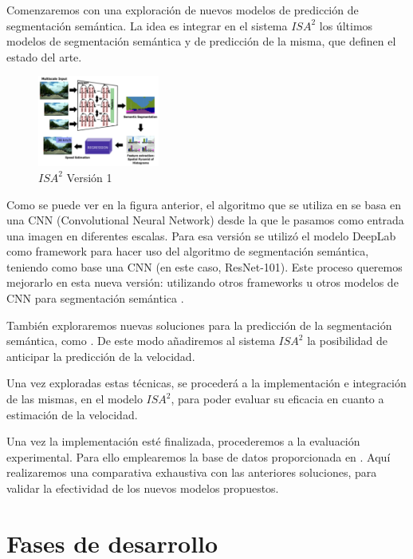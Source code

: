 \documentclass[12pt,oneside,a4paper]{article}
\begin{document}
Comenzaremos con una exploración de nuevos modelos de predicción de segmentación semántica. La idea es integrar en el sistema $ISA^2$ los últimos modelos de segmentación semántica y de predicción de la misma, que definen el estado del arte. 

\begin{figure}[h]
  \centering
  \includegraphics[width=4cm]{figuras/Figura_Esquema_ISA2_Version_1_SegSem.eps}
  \caption{$ISA^2$ Versión 1}
\end{figure}

Como se puede ver en la figura anterior, el algoritmo que se utiliza en \cite{isa2} se basa en una CNN (Convolutional Neural Network) desde la que le pasamos como entrada una imagen en diferentes escalas. Para esa versión se utilizó el modelo DeepLab \cite{falta-la-cita }como framework para hacer uso del algoritmo de segmentación semántica, teniendo como base una CNN (en este caso, ResNet-101). Este proceso queremos mejorarlo en esta nueva versión: utilizando otros frameworks u otros modelos de CNN para segmentación semántica \cite{segsem}. 

También exploraremos nuevas soluciones para la predicción de la segmentación semántica, como \cite{mete-esta-referencia-que-te-pongo-en-el-comentario}. De este modo añadiremos al sistema $ISA^2$ la posibilidad de anticipar la predicción de la velocidad.

Una vez exploradas estas técnicas, se procederá a la implementación e integración de las mismas, en el modelo $ISA^2$, para poder evaluar su eficacia en cuanto a estimación de la velocidad. 

Una vez la implementación esté finalizada, procederemos a la evaluación experimental. Para ello emplearemos la base de datos proporcionada en \cite{isa2}. Aquí realizaremos una comparativa exhaustiva con las anteriores soluciones, para validar la efectividad de los nuevos modelos propuestos.


\section{Fases de desarrollo}
\end{document}
